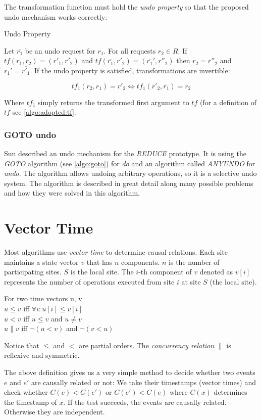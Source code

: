 The transformation function must hold the \emph{undo property} so that the proposed undo mechanism works correctly:

\begin{defn}
Undo Property
\end{defn}

Let $\overline{r_{1}}$ be an undo request for $r_{1}$. For all requests $r_{2} \in R$: If $tf(r_1,r_2) = (r'_1,r'_2)$ and $tf(\overline{r_1},r'_2) = (\overline{r_1}',r''_2)$ then $r_2 = r''_2$ and $\overline{r_1}' = \overline{r'_1}$. If the undo property is satisfied, transformations are invertible:

$$ tf_1(r_2,r_1) = r'_2 \Longleftrightarrow tf_1(r'_2,\overline{r_1}) = r_2 $$

Where $tf_1$ simply returns the transformed first argument to $tf$ (for a definition of $tf$ see \ref{algo:adopted:tf}.


\subsubsection{GOTO undo}
Sun \cite{sun02b} described an undo mechanism for the \emph{REDUCE} prototype. It is using the \emph{GOTO} algorithm (see \ref{algo:goto}) for \emph{do} and an algorithm called \emph{ANYUNDO} for \emph{undo}. The algorithm allows undoing arbitrary operations, so it is a selective undo system. The algorithm is described in great detail along many possible problems and how they were solved in this algorithm.



\section{Vector Time}
\label{sect:vectortime}

Most algorithms use \emph{vector time} to determine causal relations. Each site maintains a state vector $v$ that has $n$ components. $n$ is the number of participating sites. $S$ is the local site. The $i$-th component of $v$ denoted as $v[i]$ represents the number of operations executed from site $i$ at site $S$ (the local site). 

\begin{defn}
  For two time vectors u, v \\
  $u \leq v$ iff $\forall i : u[i] \leq v[i]$ \\
  $u < v$ iff $u \leq v$ and $u \not= v$ \\
  $u \parallel v$ iff $\neg(u < v)$ and $\neg(v < u)$
\end{defn}

Notice that $\leq$ and $<$ are partial orders. The \emph{concurrency relation} $\parallel$ is reflexive and symmetric.

The above definition gives us a very simple method to decide whether two events $e$ and $e'$ are causally related or not: We take their timestamps (vector times) and check whether $C(e) < C(e')$ or $C(e') < C(e)$ where $C(x)$ determines the timestamp of $x$. If the test succeeds, the events are causally related. Otherwise they are independent.

